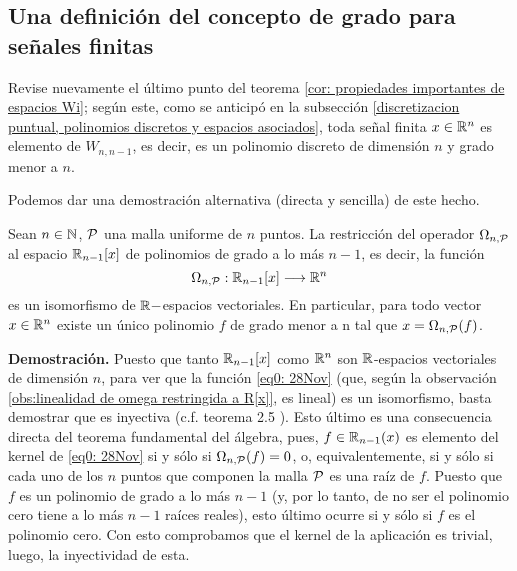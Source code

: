 \subsection{Una definición del concepto de grado para señales finitas}
\label{definicion del concepto de grado para seniales finitas}

Revise nuevamente el último punto del teorema
\ref{cor: propiedades importantes de espacios Wi}; según este,
como se anticipó en la subsección 
\ref{discretizacion puntual, polinomios discretos y espacios asociados},
toda señal finita $x \in \mathbb{R}^{n}$
es elemento de $W_{n,n-1}$,
es decir, es un polinomio discreto
de dimensión $n$ y grado menor a $n$.

Podemos dar una demostración
alternativa
(directa y sencilla) de este hecho.

\begin{prop}
\label{prop: el operador de discretizacion puntual es un isomorfismo (...)}
Sean $n \in \mathbb{N}$, $\mathcal{P}$ una malla uniforme de $n$
puntos. 
La restricción del operador $\Omega_{n, \mathcal{P}}$
al espacio $\mathbb{R}_{n-1}[x]$ de polinomios de grado a lo más
$n-1$, es decir, la función 
\begin{equation}
\label{eq0: 28Nov}
\Omega_{n, \mathcal{P}}:
\mathbb{R}_{n-1}[x] \longrightarrow \mathbb{R}^{n}
\end{equation}
es un isomorfismo de $\mathbb{R}-$espacios vectoriales.
En particular, para todo vector $x \in \mathbb{R}^{n}$
existe un único polinomio $f$ de grado menor a n
tal que $x = \Omega_{n, \mathcal{P}}(f)$.
\end{prop}
\noindent
\textbf{Demostración.}
Puesto que tanto $\mathbb{R}_{n-1}[x]$
como $\mathbb{R}^{n}$ son $\mathbb{R}$-espacios vectoriales
de dimensión $n$, para ver que la función 
\eqref{eq0: 28Nov} (que, según la observación 
\ref{obs:linealidad de omega restringida a R[x]}, es lineal)
es un isomorfismo, basta
demostrar que es inyectiva 
(c.f. teorema 2.5 ).
Esto último es una consecuencia directa del 
teorema fundamental del álgebra,
pues, 
$f \in \mathbb{R}_{n-1}(x)$
es elemento del kernel
de \eqref{eq0: 28Nov} si y sólo si 
$\Omega_{n, \mathcal{P}}(f)=0$, o, equivalentemente,
si y sólo si 
cada uno de los $n$ puntos que componen la
malla $\mathcal{P}$ es una raíz de $f$. Puesto que
$f$ es un polinomio de grado a lo más $n-1$
(y, por lo tanto, de no ser el polinomio cero tiene
a lo más $n-1$ raíces reales),
esto último ocurre si y sólo si $f$ es el polinomio cero.
Con esto comprobamos que el kernel de la aplicación
\label{eq1: 25Nov} es trivial, luego, la inyectividad
de esta.
\QEDB
\vspace{0.2cm}

